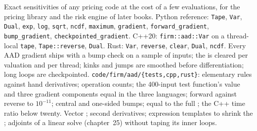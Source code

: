 \begin{build}
 Exact sensitivities of any pricing code at the cost of a few evaluations, for the pricing library and the risk engine of later books.
 Python reference: \texttt{Tape}, \texttt{Var}, \texttt{Dual}, \texttt{exp}, \texttt{log}, \texttt{sqrt}, \texttt{ncdf}, \texttt{maximum}, \texttt{gradient}, \texttt{forward\_gradient},
\texttt{bump\_gradient}, \texttt{checkpointed\_gradient}. C++20: \texttt{firm::aad::Var} on a thread-local \texttt{tape}, \texttt{Tape::reverse}, \texttt{Dual}. Rust: \texttt{Var}, \texttt{reverse},
\texttt{clear}, \texttt{Dual}, \texttt{ncdf}.
 Every AAD gradient ships with a bump check on a sample of inputs; the  is cleared per valuation and per thread; kinks and jumps are smoothed before differentiation; long loops are
checkpointed.
 \texttt{code/firm/aad/\{tests,cpp,rust\}}: elementary rules against hand derivatives; operation counts; the 400-input test function's value and three gradient components
equal in the three languages; forward against reverse to $10^{-11}$; central and one-sided bumps;  equal to the full ; the C++ time ratio below twenty.
 Vector ; second derivatives; expression templates to shrink the ; adjoints of a linear solve (chapter~25) without taping its inner loops.
\end{build}

